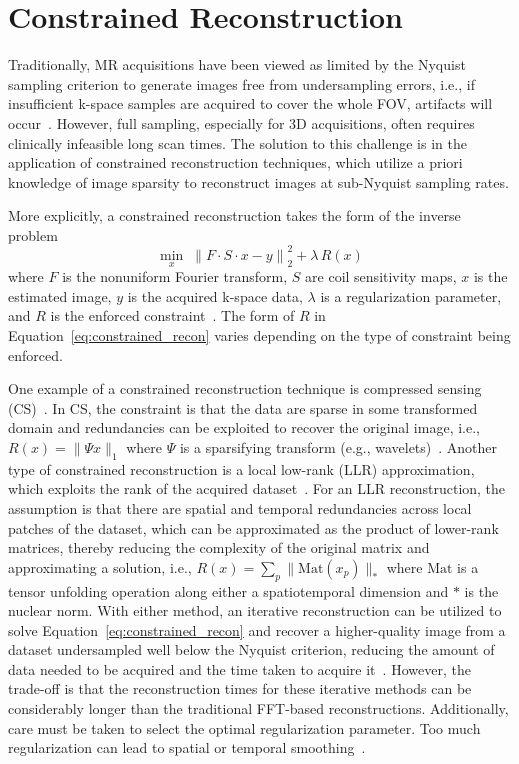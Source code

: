 \section{Constrained Reconstruction}\label{sec:constrained}
Traditionally, MR acquisitions have been viewed as limited by the Nyquist sampling criterion to generate images free from undersampling errors, i.e., if insufficient k-space samples are acquired to cover the whole FOV, artifacts will occur~\cite{mamourianPracticalMRPhysics2010}. However, full sampling, especially for 3D acquisitions, often requires clinically infeasible long scan times. The solution to this challenge is in the application of constrained reconstruction techniques, which utilize a priori knowledge of image sparsity to reconstruct images at sub-Nyquist sampling rates.

More explicitly, a constrained reconstruction takes the form of the inverse problem 
\begin{equation}
    \min_{x} \; \left\| F \cdot S \cdot x - y \right\|_2^2 + \lambda \, R(x)
    \label{eq:constrained_recon}
\end{equation}
where $F$ is the nonuniform Fourier transform, $S$ are coil sensitivity maps, $x$ is the estimated image, $y$ is the acquired k-space data, $\lambda$ is a regularization parameter, and $R$ is the enforced constraint~\cite{haldarChapter5Early2022}. The form of $R$ in Equation~\ref{eq:constrained_recon} varies depending on the type of constraint being enforced.

One example of a constrained reconstruction technique is compressed sensing (CS)~\cite{lustigSparseMRIApplication2007}. In CS, the constraint is that the data are sparse in some transformed domain and redundancies can be exploited to recover the original image, i.e., $R(x)=\|\Psi x\|_1$ where $\Psi$ is a sparsifying transform (e.g., wavelets)~\cite{lustigSparseMRIApplication2007}. Another type of constrained reconstruction is a local low-rank (LLR) approximation, which exploits the rank of the acquired dataset~\cite{haldarLowrankApproximationsDynamic2011,leeLLORMALocalLowrank2016}. For an LLR reconstruction, the assumption is that there are spatial and temporal redundancies across local patches of the dataset, which can be approximated as the product of lower-rank matrices, thereby reducing the complexity of the original matrix and approximating a solution, i.e., $R(x)=\sum_p \|\mathrm{Mat}(x_p)\|_*$ where $\mathrm{Mat}$ is a tensor unfolding operation along either a spatiotemporal dimension and $*$ is the nuclear norm. With either method, an iterative reconstruction can be utilized to solve Equation~\ref{eq:constrained_recon} and recover a higher-quality image from a dataset undersampled well below the Nyquist criterion, reducing the amount of data needed to be acquired and the time taken to acquire it~\cite{haldarChapter5Early2022}. However, the trade-off is that the reconstruction times for these iterative methods can be considerably longer than the traditional FFT-based reconstructions. Additionally, care must be taken to select the optimal regularization parameter. Too much regularization can lead to spatial or temporal smoothing~\cite{lustigSparseMRIApplication2007}.

